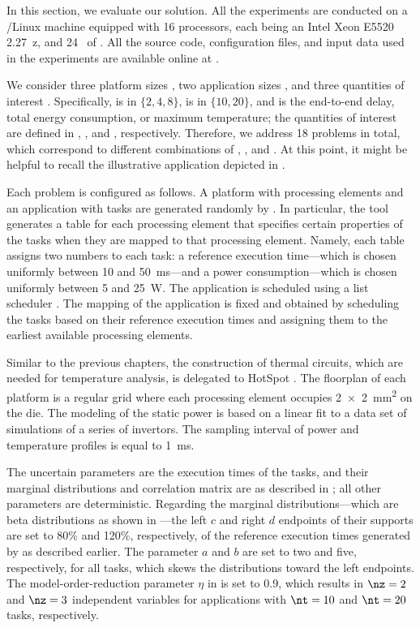 In this section, we evaluate our solution. All the experiments are conducted on
a /Linux machine equipped with 16 processors, each being an Intel Xeon
E5520 2.27~z, and 24~ of . All the source code,
configuration files, and input data used in the experiments are available online
at \cite{eslab2017a}.

We consider three platform sizes \np, two application sizes \nt, and three
quantities of interest \g. Specifically, \np is in $\{ 2, 4, 8 \}$, \nt is in
$\{ 10, 20 \}$, and \g is the end-to-end delay, total energy consumption, or
maximum temperature; the quantities of interest are defined in
, , and ,
respectively. Therefore, we address 18 problems in total, which correspond to
different combinations of \np, \nt, and \g. At this point, it might be helpful
to recall the illustrative application depicted in .

Each problem is configured as follows. A platform with \np processing elements
and an application with \nt tasks are generated randomly by 
\cite{dick1998}. In particular, the tool generates a table for each processing
element that specifies certain properties of the tasks when they are mapped to
that processing element. Namely, each table assigns two numbers to each task: a
reference execution time---which is chosen uniformly between 10 and 50~ms---and
a power consumption---which is chosen uniformly between 5 and 25~W. The
application is scheduled using a list scheduler \cite{adam1974}. The mapping of
the application is fixed and obtained by scheduling the tasks based on their
reference execution times and assigning them to the earliest available
processing elements.

Similar to the previous chapters, the construction of thermal  circuits,
which are needed for temperature analysis, is delegated to HotSpot
\cite{skadron2003}. The floorplan of each platform is a regular grid where each
processing element occupies 2~×~2~mm\textsuperscript{2} on the die. The modeling
of the static power is based on a linear fit to a data set of 
simulations of a series of  invertors. The sampling interval of power
and temperature profiles is equal to 1~ms.

The uncertain parameters \vu are the execution times of the tasks, and their
marginal distributions and correlation matrix are as described in
; all other parameters are deterministic. Regarding the
marginal distributions---which are beta distributions as shown in
---the left $c$ and right $d$ endpoints of their
supports are set to 80\% and 120\%, respectively, of the reference execution
times generated by  as described earlier. The parameter $a$ and $b$ are
set to two and five, respectively, for all tasks, which skews the distributions
toward the left endpoints. The model-order-reduction parameter $\eta$ in
 is set to 0.9, which results in $\nz = 2$ and $\nz
= 3$ independent variables for applications with $\nt = 10$ and $\nt = 20$
tasks, respectively.

